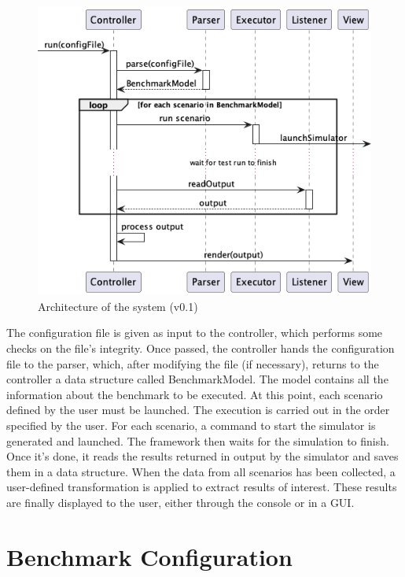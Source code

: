 \documentclass[12pt,a4paper,openright,twoside]{book}
\begin{document}
\begin{figure}[h]
  \centering
  \includegraphics[width=\textwidth]{figures/execution-sequence-diagram.png}
  \caption{Architecture of the system (v0.1)}
  \label{fig:random-image}
\end{figure}

The configuration file is given as input to the controller, which performs some checks on the file's integrity.
Once passed, the controller hands the configuration file to the parser, which, after modifying the file (if necessary), returns to the controller a data structure called BenchmarkModel.
The model contains all the information about the benchmark to be executed.
At this point, each scenario defined by the user must be launched.
The execution is carried out in the order specified by the user.
For each scenario, a command to start the simulator is generated and launched.
The framework then waits for the simulation to finish.
Once it's done, it reads the results returned in output by the simulator and saves them in a data structure.
When the data from all scenarios has been collected, a user-defined transformation is applied to extract results of interest.
These results are finally displayed to the user, either through the console or in a GUI.

\section{Benchmark Configuration}
\end{document}
